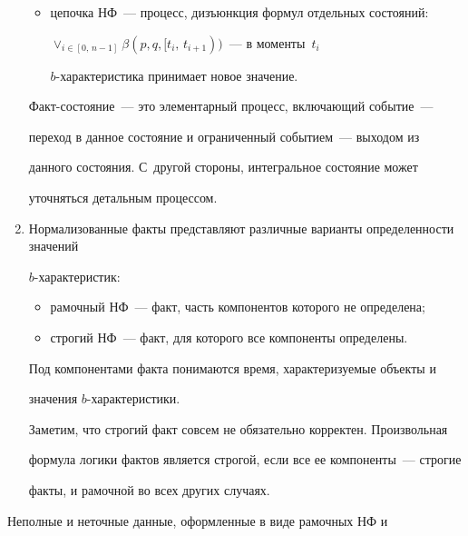 \begin{multicols}{2}
\begin{enumerate}[1.]
\begin{itemize}
\item цепочка НФ~--- процесс, дизъюнкция формул отдельных состояний: 


$\vee_{i\in [0,\,n-1]} \beta(p,q,[t_i,\,t_{i+1}))$~--- в моменты~$t_i$ 


$b$-характеристика принимает новое значение.


\end{itemize}





  Факт-состояние~--- это элементарный процесс, включающий событие~--- 


переход в данное состояние и ограниченный событием~--- выходом из 


данного состояния. С~другой стороны, интегральное состояние может 


уточняться детальным процессом. 


\item Нормализованные факты представляют раз\-лич\-ные варианты определенности значений\linebreak 


$b$-ха\-рак\-те\-ристик:


\begin{itemize}


\item рамочный НФ~--- факт, часть компонентов которого не определена;


\item строгий НФ~--- факт, для которого все компоненты определены.


  \end{itemize}


  


  Под компонентами факта понимаются время, характеризуемые объекты и 


значения $b$-ха\-рак\-те\-ри\-стики.


  


  Заметим, что строгий факт совсем не обязательно корректен. Произвольная 


формула логики фактов является строгой, если все ее компоненты~--- строгие 


факты, и рамочной во всех других случаях.


  \end{enumerate}


  


  Неполные и неточные данные, оформленные в виде рамочных НФ и 



\end{multicols}
